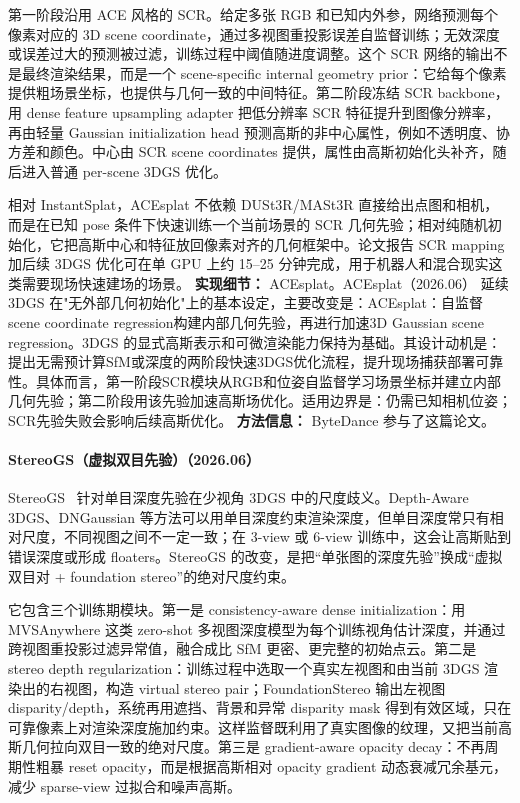 第一阶段沿用 ACE 风格的 SCR。给定多张 RGB 和已知内外参，网络预测每个像素对应的 3D scene coordinate，通过多视图重投影误差自监督训练；无效深度或误差过大的预测被过滤，训练过程中阈值随进度调整。这个 SCR 网络的输出不是最终渲染结果，而是一个 scene-specific internal geometry prior：它给每个像素提供粗场景坐标，也提供与几何一致的中间特征。第二阶段冻结 SCR backbone，用 dense feature upsampling adapter 把低分辨率 SCR 特征提升到图像分辨率，再由轻量 Gaussian initialization head 预测高斯的非中心属性，例如不透明度、协方差和颜色。中心由 SCR scene coordinates 提供，属性由高斯初始化头补齐，随后进入普通 per-scene 3DGS 优化。

相对 InstantSplat，ACEsplat 不依赖 DUSt3R/MASt3R 直接给出点图和相机，而是在已知 pose 条件下快速训练一个当前场景的 SCR 几何先验；相对纯随机初始化，它把高斯中心和特征放回像素对齐的几何框架中。论文报告 SCR mapping 加后续 3DGS 优化可在单 GPU 上约 15--25 分钟完成，用于机器人和混合现实这类需要现场快速建场的场景。
\textbf{实现细节：} ACEsplat。ACEsplat（2026.06） 延续 3DGS 在"无外部几何初始化"上的基本设定，主要改变是：ACEsplat：自监督scene coordinate regression构建内部几何先验，再进行加速3D Gaussian scene regression。3DGS 的显式高斯表示和可微渲染能力保持为基础。其设计动机是：提出无需预计算SfM或深度的两阶段快速3DGS优化流程，提升现场捕获部署可靠性。具体而言，第一阶段SCR模块从RGB和位姿自监督学习场景坐标并建立内部几何先验；第二阶段用该先验加速高斯场优化。适用边界是：仍需已知相机位姿；SCR先验失败会影响后续高斯优化。
\textbf{方法信息：} ByteDance 参与了这篇论文。



\paragraph{StereoGS（虚拟双目先验）（2026.06）}
StereoGS~\cite{2606_30545} 针对单目深度先验在少视角 3DGS 中的尺度歧义。Depth-Aware 3DGS、DNGaussian 等方法可以用单目深度约束渲染深度，但单目深度常只有相对尺度，不同视图之间不一定一致；在 3-view 或 6-view 训练中，这会让高斯贴到错误深度或形成 floaters。StereoGS 的改变，是把“单张图的深度先验”换成“虚拟双目对 + foundation stereo”的绝对尺度约束。

它包含三个训练期模块。第一是 consistency-aware dense initialization：用 MVSAnywhere 这类 zero-shot 多视图深度模型为每个训练视角估计深度，并通过跨视图重投影过滤异常值，融合成比 SfM 更密、更完整的初始点云。第二是 stereo depth regularization：训练过程中选取一个真实左视图和由当前 3DGS 渲染出的右视图，构造 virtual stereo pair；FoundationStereo 输出左视图 disparity/depth，系统再用遮挡、背景和异常 disparity mask 得到有效区域，只在可靠像素上对渲染深度施加约束。这样监督既利用了真实图像的纹理，又把当前高斯几何拉向双目一致的绝对尺度。第三是 gradient-aware opacity decay：不再周期性粗暴 reset opacity，而是根据高斯相对 opacity gradient 动态衰减冗余基元，减少 sparse-view 过拟合和噪声高斯。

